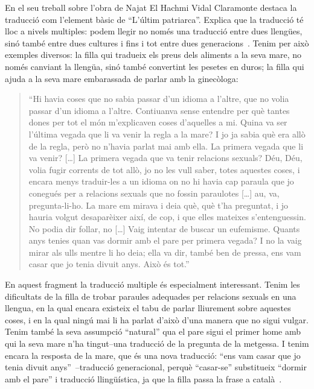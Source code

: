 En el seu treball sobre l'obra de Najat El Hachmi Vidal Claramonte destaca la traducció com l'element bàsic de ``L'últim patriarca''.
Explica que la traducció té lloc a nivels multiples: podem llegir no només una traducció entre dues llengües, sinó també entre dues cultures i fins i tot entre dues generacions~\autocite{Vidal2012}.
Tenim per això exemples diversos:
la filla qui tradueix els preus dels aliments a la seva mare, no només canviant la llengüa, sinó també convertint les pesetes en duros;
la filla qui ajuda a la seva mare embarassada de parlar amb la ginecòloga:
\begin{quote}
``Hi havia coses que no sabia passar d'un idioma a l'altre, que no volia passar d'un idioma a l'altre. Contiuanva sense entendre per què tantes dones per tot el món m'explicaven coses d'aquelles a mi. Quina va ser l'última vegada que li va venir la regla a la mare? I jo ja sabia què era allò de la regla, però no n'havia parlat mai amb ella. La primera vegada que li va venir? [\ldots] La primera vegada que va tenir relacions sexuals? Déu, Déu, volia fugir corrents de tot allò, jo no les vull saber, totes aquestes coses, i encara menys traduir-les a un idioma on no hi havia cap paraula que jo conegués per a relacions sexuals que no fossin paraulotes [\ldots] au, va, pregunta-li-ho. La mare em mirava i deia què, què t'ha preguntat, i jo hauria volgut desaparèixer així, de cop, i que elles mateixes s'entenguessin. No podia dir follar, no [\ldots] Vaig intentar de buscar un eufemisme. Quants anys tenies quan vas dormir amb el pare per primera vegada? I no la vaig mirar als ulls mentre li ho deia; ella va dir, també ben de pressa, ens vam casar que jo tenia divuit anys. Això és tot.''~\autocite[217]{ElHachmi2008}
\end{quote}
En aquest fragment la traducció multiple és especialment interessant.
Tenim les dificultats de la filla de trobar paraules adequades per relacions sexuals en una llengua, en la qual encara existeix el tabu de parlar lliurement sobre aquestes coses,
i en la qual ningú mai li ha parlat d'això d'una manera que no sigui vulgar.
Tenim també la seva assumpció ``natural'' qua el pare sigui el primer home amb qui la seva mare n'ha tingut--una traducció de la pregunta de la metgessa.
I tenim encara la resposta de la mare, que és una nova traducció: ``ens vam casar que jo tenia divuit anys''~\autocite[217]{ElHachmi2008}--traducció generacional, perquè ``casar-se'' substitueix ``dormir amb el pare'' i traducció llingüística, ja que la filla passa la frase a català~\autocite{Vidal2012}.

